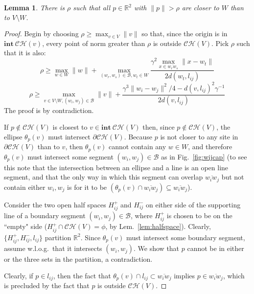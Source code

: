 \documentclass[11pt]{article}
\newtheorem{lemma}[theorem]{Lemma}
\begin{document}
\begin{lemma}\label{lem:VW}
	There is $\rho$ such that all $p\in\mathbb{R}^2$ with $\|p\| > \rho$ 
are closer to $W$ than to $V\setminus W$. \end{lemma}
\begin{proof}
Begin by choosing $\rho \ge \max_{v\in V} \|v\|$ so that, since the
origin is in $\mathbf{int\ }{\mathcal{CH}(v)}$, every point of norm greater than $\rho$ is outside $\mathcal{CH}(V)$.
Pick $\rho$ such that it is also:
\begin{equation}\label{eqi}
\rho \ge \displaystyle{\max_{w\in W}\|w\| + \max_{(w_r,w_s)\in\mathcal{B},w_t\in W} \frac{\gamma^2 \max_{x\in\overline{w_r w_s}} \|x - w_t\|}{2 d(w_t, l_{ij})}}
\end{equation}
\begin{equation}\label{eqii}
\rho \ge \displaystyle{\max_{v\in V\setminus W, (w_i,w_j)\in\mathcal{B}} \|v\| + 
	\frac{\gamma^3 \|w_i - w_j\|^2 / 4 - d(v,l_{ij})^2\gamma^{-1}}{ 2 d(v,l_{ij})} } 
\end{equation}
The proof is by contradiction. 

If $p\notin\mathcal{CH}(V)$ is closest to
$v\in\mathbf{int\ }{\mathcal{CH}(V)}$ then, since $p\notin\mathcal{CH}(V)$, the ellipse 
$\theta_p(v)$ must intersect $\partial\mathcal{CH}(V)$. 
Because $p$ is not closer to any site in
$\partial\mathcal{CH}(V)$ than to $v$, then $\theta_p(v)$ cannot contain any
$w\in W$, and therefore $\theta_p(v)$ must intersect some segment $(w_i,w_j)\in\mathcal{B}$
as in Fig.~\ref{fig:wijcap} (to see this note that the intersection between an ellipse
and a line is an open line segment, and that the only way in which this
segment can overlap $\overline{w_i w_j}$ but not contain either $w_i,w_j$ is for
it to be $(\theta_p(v)\cap \overline{w_i w_j})\subseteq\overline{w_i w_j}$). 



Consider the two open half spaces $H^{+}_{ij}$ and $H^{-}_{ij}$ on either side of
the supporting line of a boundary segment $(w_i,w_j)\in\mathcal{B}$, where
$H^{+}_{ij}$ is chosen to be on the ``empty" side
($H^{+}_{ij}\cap\mathcal{CH}(V)=\phi$, by Lem.~\ref{lem:halfspace}). 
Clearly, $\{H^{+}_{ij}, H^{-}_{ij}, l_{ij}\}$ partition $\mathbb{R}^2$. 
Since $\theta_p(v)$ must intersect some boundary segment, assume w.l.o.g.\   that
it intersects $(w_i,w_j)$. We show that $p$ cannot be in either
or the three sets in the partition, a contradiction. 


Clearly, if $p\in l_{ij}$, then the fact that $\theta_p(v)\cap l_{ij}\subset\overline{w_i w_j}$
implies $p\in\overline{w_i w_j}$, which is precluded by
the fact that $p$ is outside $\mathcal{CH}(V)$. 


\end{proof}
\end{document}
